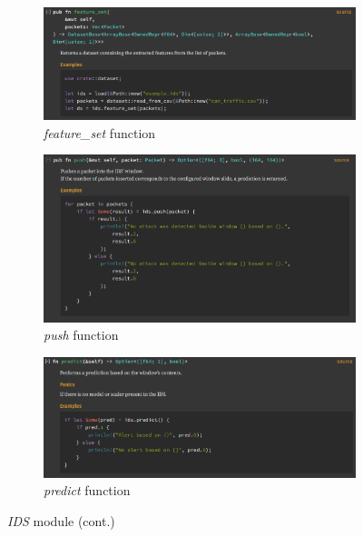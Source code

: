 \begin{figure}
    \ContinuedFloat
    \begin{subfigure}[b]{\linewidth}
        \includegraphics[width = \linewidth]{img/parts/docs/ids/ids_struct_featureset.png}
        \caption{\emph{feature\_set} function}
        \label{subfig:doc_ids_stuct_featureset}
    \end{subfigure}
    \begin{subfigure}[b]{\linewidth}
        \includegraphics[width = \linewidth]{img/parts/docs/ids/ids_struct_push.png}
        \caption{\emph{push} function}
        \label{subfig:doc_ids_stuct_push}
    \end{subfigure}
    \begin{subfigure}[b]{\linewidth}
        \includegraphics[width = \linewidth]{img/parts/docs/ids/ids_struct_predict.png}
        \caption{\emph{predict} function}
        \label{subfig:doc_ids_stuct_predict}
    \end{subfigure}
    \caption{\emph{IDS} module (cont.)}
    \label{fig:doc_ids}
\end{figure}
